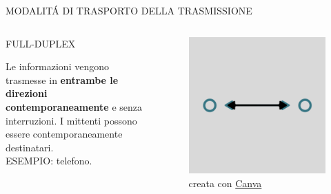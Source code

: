 \documentclass[aspectratio=1610]{beamer}
\begin{document}
\begin{frame}{MODALIT\'A DI TRASPORTO DELLA TRASMISSIONE}
    \begin{columns}
        \begin{alertblock}{FULL-DUPLEX}
            \begin{minipage}{0.96\linewidth}
                \justifying
                Le informazioni vengono trasmesse in \textbf{entrambe le direzioni contemporaneamente} e senza interruzioni. 
                I mittenti possono essere contemporaneamente destinatari.\\
                ESEMPIO: telefono.
            \end{minipage}
        \end{alertblock}
           \begin{figure}
               \includegraphics[width=\linewidth]{img/fullduplex.png}
               \caption{{creata con \href{https://www.canva.com}{Canva}}}
           \end{figure}
    \end{columns}
\end{frame}
\end{document}
